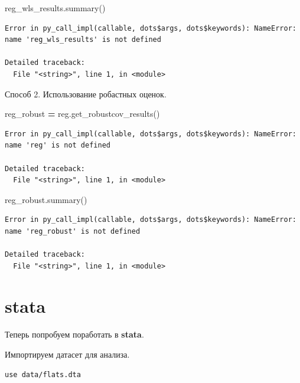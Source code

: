 \documentclass[]{book}
\newenvironment{Shaded}{\begin{snugshade}}{\end{snugshade}}
\newcommand{\NormalTok}[1]{#1}
\newcommand{\OperatorTok}[1]{\textcolor[rgb]{0.81,0.36,0.00}{\textbf{#1}}}
\begin{document}
\begin{Shaded}
\begin{Highlighting}[]
\NormalTok{reg_wls_results.summary()}
\end{Highlighting}
\end{Shaded}

\begin{verbatim}
Error in py_call_impl(callable, dots$args, dots$keywords): NameError: name 'reg_wls_results' is not defined

Detailed traceback: 
  File "<string>", line 1, in <module>
\end{verbatim}

Способ 2. Использование робастных оценок.

\begin{Shaded}
\begin{Highlighting}[]
\NormalTok{reg_robust }\OperatorTok{=}\NormalTok{ reg.get_robustcov_results()}
\end{Highlighting}
\end{Shaded}

\begin{verbatim}
Error in py_call_impl(callable, dots$args, dots$keywords): NameError: name 'reg' is not defined

Detailed traceback: 
  File "<string>", line 1, in <module>
\end{verbatim}

\begin{Shaded}
\begin{Highlighting}[]
\NormalTok{reg_robust.summary()}
\end{Highlighting}
\end{Shaded}

\begin{verbatim}
Error in py_call_impl(callable, dots$args, dots$keywords): NameError: name 'reg_robust' is not defined

Detailed traceback: 
  File "<string>", line 1, in <module>
\end{verbatim}

\hypertarget{stata-3}{%
\section{stata}\label{stata-3}}

Теперь попробуем поработать в \textbf{stata}.

Импортируем датасет для анализа.

\begin{verbatim}
use data/flats.dta
\end{verbatim}
\end{document}
